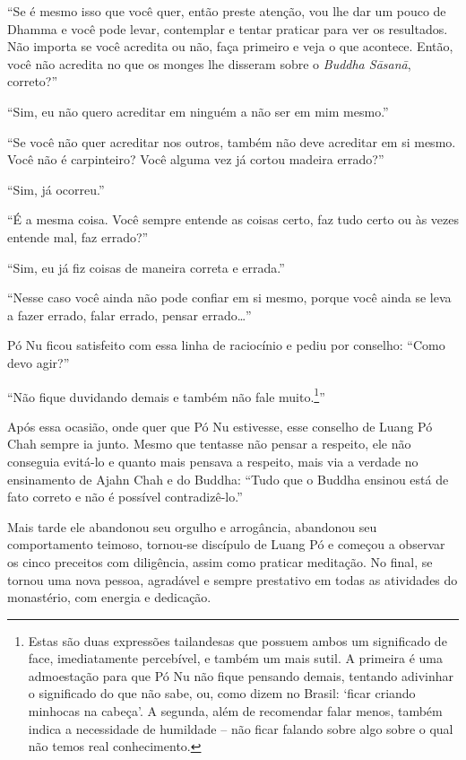 ``Se é mesmo isso que você quer, então preste atenção, vou lhe dar um
pouco de Dhamma e você pode levar, contemplar e tentar praticar para ver
os resultados. Não importa se você acredita ou não, faça primeiro e veja
o que acontece. Então, você não acredita no que os monges lhe disseram
sobre o \emph{Buddha Sāsanā}, correto?''

``Sim, eu não quero acreditar em ninguém a não ser em mim mesmo.''

``Se você não quer acreditar nos outros, também não deve acreditar em si
mesmo. Você não é carpinteiro? Você alguma vez já cortou madeira
errado?''

``Sim, já ocorreu.''

``É a mesma coisa. Você sempre entende as coisas certo, faz tudo certo
ou às vezes entende mal, faz errado?''

``Sim, eu já fiz coisas de maneira correta e errada.''

``Nesse caso você ainda não pode confiar em si mesmo, porque você ainda
se leva a fazer errado, falar errado, pensar errado\ldots{}''

Pó Nu ficou satisfeito com essa linha de raciocínio e pediu por
conselho: ``Como devo agir?''

``Não fique duvidando demais e também não fale muito.\footnote{Estas são
  duas expressões tailandesas que possuem ambos um significado de face,
  imediatamente percebível, e também um mais sutil. A primeira é uma
  admoestação para que Pó Nu não fique pensando demais, tentando
  adivinhar o significado do que não sabe, ou, como dizem no Brasil:
  `ficar criando minhocas na cabeça'. A segunda, além de recomendar
  falar menos, também indica a necessidade de humildade -- não ficar
  falando sobre algo sobre o qual não temos real conhecimento.}''

Após essa ocasião, onde quer que Pó Nu estivesse, esse conselho de Luang
Pó Chah sempre ia junto. Mesmo que tentasse não pensar a respeito, ele
não conseguia evitá-lo e quanto mais pensava a respeito, mais via a
verdade no ensinamento de Ajahn Chah e do Buddha: ``Tudo que o Buddha
ensinou está de fato correto e não é possível contradizê-lo.''

Mais tarde ele abandonou seu orgulho e arrogância, abandonou seu
comportamento teimoso, tornou-se discípulo de Luang Pó e começou a
observar os cinco preceitos com diligência, assim como praticar
meditação. No final, se tornou uma nova pessoa, agradável e sempre
prestativo em todas as atividades do monastério, com energia e
dedicação.


